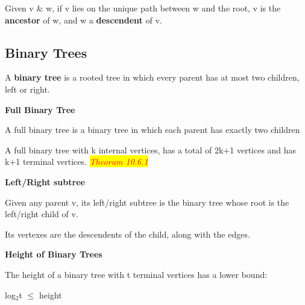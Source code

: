\documentclass{article}
\newcommand{\theorum}[1]{\quad \quad \colorbox{yellow}{\textit{\textcolor{red}{Theorum #1}}}}
\newcommand{\sub}[1]{\vspace{10pt}\textbf{#1}}
\newcommand{\sbreak}{\vspace{10pt}}
\begin{document}
Given v \& w, if v lies on the unique path between w and the root, v is the \textbf{ancestor} of w, and w a \textbf{descendent} of v.

\subsection{Binary Trees}
A \textbf{binary tree} is a rooted tree in which every parent has at most two children, left or right.

\sub{Full Binary Tree}

A full binary tree is a binary tree in which each parent has exactly two children

\sbreak

A full binary tree with k internal vertices, has a total of 2k+1 vertices and has k+1 terminal vertices. \theorum{10.6.1}

\sub{Left/Right subtree}

Given any parent v, its left/right subtree is the binary tree whose root is the left/right child of v.

Its vertexes are the descendents of the child, along with the edges.

\sub{Height of Binary Trees}

The height of a binary tree with t terminal vertices has a lower bound:
\begin{center}
    log$_2$t $\leq$ height
\end{center}
\end{document}
